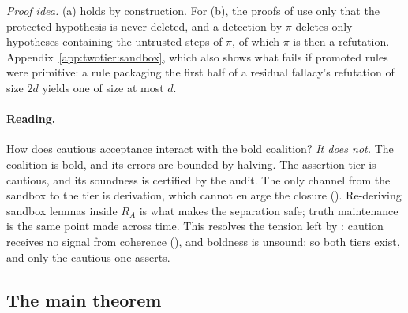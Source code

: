 \noindent\emph{Proof idea.} (a) holds by construction. For (b), the proofs of  use only that the protected hypothesis is never deleted, and a detection by $\pi$ deletes only hypotheses containing the untrusted steps of $\pi$, of which $\pi$ is then a refutation. Appendix~\ref{app:twotier:sandbox}, which also shows what fails if promoted rules were primitive: a rule packaging the first half of a residual fallacy's refutation of size $2d$ yields one of size at most $d$.

\paragraph{Reading.} How does cautious acceptance interact with the bold coalition? \emph{It does not.} The coalition is bold, and its errors are bounded by halving. The assertion tier is cautious, and its soundness is certified by the audit. The only channel from the sandbox to the tier is derivation, which cannot enlarge the closure (). Re-deriving sandbox lemmas inside $R_A$ is what makes the separation safe; truth maintenance is the same point made across time. This resolves the tension left by : caution receives no signal from coherence (), and boldness is unsound; so both tiers exist, and only the cautious one asserts.

\subsection{The main theorem}\label{sec:twotier:main}

